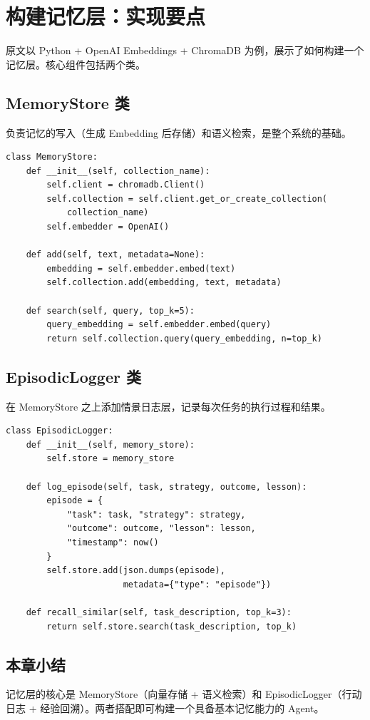 \section{构建记忆层：实现要点}

原文以 Python + OpenAI Embeddings + ChromaDB 为例，展示了如何构建一个记忆层。核心组件包括两个类。

\subsection{MemoryStore 类}

负责记忆的写入（生成 Embedding 后存储）和语义检索，是整个系统的基础。

\begin{lstlisting}[caption={MemoryStore 核心接口（伪代码）}]
class MemoryStore:
    def __init__(self, collection_name):
        self.client = chromadb.Client()
        self.collection = self.client.get_or_create_collection(
            collection_name)
        self.embedder = OpenAI()

    def add(self, text, metadata=None):
        embedding = self.embedder.embed(text)
        self.collection.add(embedding, text, metadata)

    def search(self, query, top_k=5):
        query_embedding = self.embedder.embed(query)
        return self.collection.query(query_embedding, n=top_k)
\end{lstlisting}

\subsection{EpisodicLogger 类}

在 MemoryStore 之上添加情景日志层，记录每次任务的执行过程和结果。

\begin{lstlisting}[caption={EpisodicLogger 核心接口（伪代码）}]
class EpisodicLogger:
    def __init__(self, memory_store):
        self.store = memory_store

    def log_episode(self, task, strategy, outcome, lesson):
        episode = {
            "task": task, "strategy": strategy,
            "outcome": outcome, "lesson": lesson,
            "timestamp": now()
        }
        self.store.add(json.dumps(episode),
                       metadata={"type": "episode"})

    def recall_similar(self, task_description, top_k=3):
        return self.store.search(task_description, top_k)
\end{lstlisting}

\subsection{本章小结}

记忆层的核心是 MemoryStore（向量存储 + 语义检索）和 EpisodicLogger（行动日志 + 经验回溯）。两者搭配即可构建一个具备基本记忆能力的 Agent。

